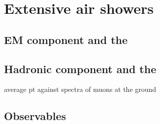 \chapter[Extensive air showers]{Extensive air showers}
\label{sec:showers}


\section{EM component and the \xmax}

\section{Hadronic component and the \nmu}


\cite{Pierog:2013dya,Knapp:2002vs,Meurer:2005dt,Pierog:2017nes,Espadanal:2016jse}

average pt against spectra of muons at the ground

\section{Observables}


\subsection{\xmax}

\subsection{\nmu}


\subsection{\xmumax}



